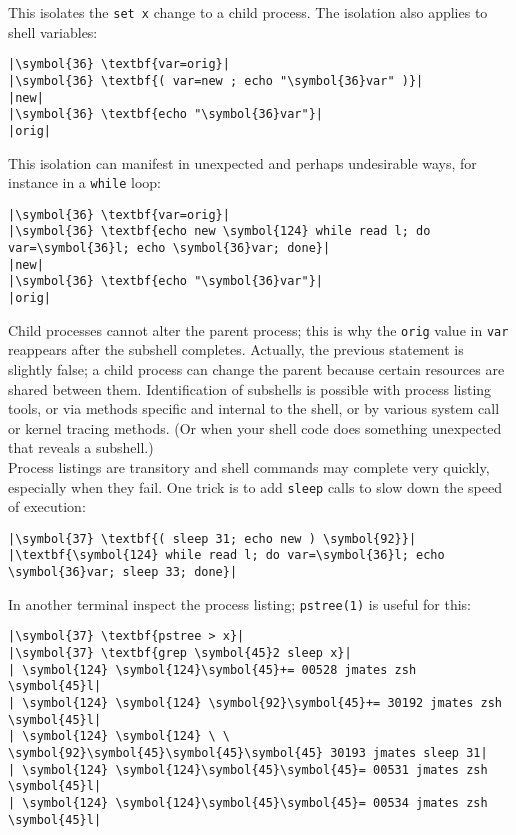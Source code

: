 \documentclass[10pt,a4paper]{article}
\begin{document}
This isolates the \texttt{set x} change to a child process.
The isolation also applies to shell variables:

\begin{lstlisting}
|\symbol{36} \textbf{var=orig}|
|\symbol{36} \textbf{( var=new ; echo "\symbol{36}var" )}|
|new|
|\symbol{36} \textbf{echo "\symbol{36}var"}|
|orig|
\end{lstlisting}

This isolation can manifest in unexpected and perhaps undesirable ways,
for instance in a \texttt{while} loop:

\begin{lstlisting}
|\symbol{36} \textbf{var=orig}|
|\symbol{36} \textbf{echo new \symbol{124} while read l; do var=\symbol{36}l; echo \symbol{36}var; done}|
|new|
|\symbol{36} \textbf{echo "\symbol{36}var"}|
|orig|
\end{lstlisting}

Child processes cannot alter the parent process; this is why the
\texttt{orig} value in \texttt{var} reappears after the subshell
completes. Actually, the previous statement is slightly false; a child
process can change the parent because certain resources are shared
between them. Identification of subshells is possible with process
listing tools, or via methods specific and internal to the shell, or by
various system call or kernel tracing methods. (Or when your shell code
does something unexpected that reveals a subshell.) \\

Process listings are transitory and shell commands may complete very
quickly, especially when they fail. One trick is to add \texttt{sleep}
calls to slow down the speed of execution:

\begin{lstlisting}
|\symbol{37} \textbf{( sleep 31; echo new ) \symbol{92}}|
|\textbf{\symbol{124} while read l; do var=\symbol{36}l; echo \symbol{36}var; sleep 33; done}|
\end{lstlisting}

In another terminal inspect the process listing; \texttt{pstree(1)} is
useful for this:

\begin{lstlisting}
|\symbol{37} \textbf{pstree > x}|
|\symbol{37} \textbf{grep \symbol{45}2 sleep x}|
| \symbol{124} \symbol{124}\symbol{45}+= 00528 jmates zsh \symbol{45}l|
| \symbol{124} \symbol{124} \symbol{92}\symbol{45}+= 30192 jmates zsh \symbol{45}l|
| \symbol{124} \symbol{124} \ \ \symbol{92}\symbol{45}\symbol{45}\symbol{45} 30193 jmates sleep 31|
| \symbol{124} \symbol{124}\symbol{45}\symbol{45}= 00531 jmates zsh \symbol{45}l|
| \symbol{124} \symbol{124}\symbol{45}\symbol{45}= 00534 jmates zsh \symbol{45}l|
\end{lstlisting}
\end{document}

